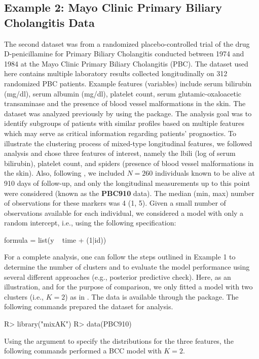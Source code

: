 \subsection{Example 2: Mayo Clinic Primary Biliary Cholangitis Data}
The second dataset was from a randomized placebo-controlled trial of the drug D-penicillamine for Primary Biliary Cholangitis conducted between 1974 and 1984 at the Mayo Clinic Primary Biliary Cholangitis (PBC). The dataset used here contains multiple laboratory results collected longitudinally on 312 randomized PBC patients. Example features (variables) include serum bilirubin (mg/dl), serum albumin (mg/dl), platelet count, serum glutamic-oxaloacetic transaminase and the presence of blood vessel malformations in the skin. The dataset was analyzed previously by \citet{Komarek2013} using the  package. The analysis goal was to identify subgroups of patients with similar profiles based on multiple features which may serve as critical information regarding patients’ prognostics.
To illustrate the clustering process of mixed-type longitudinal features, we followed \citet{Komarek2013} analysis and chose three features of interest, namely the lbili (log of serum bilirubin), platelet count, and spiders (presence of blood vessel malformations in the skin). Also, following \citet{Komarek2013}, we included $N = 260$ individuals known to be alive at 910 days of follow-up, and only the longitudinal measurements up to this point were considered (known as the \textbf{PBC910} data). The median (min, max) number of observations for these markers was 4 (1, 5). Given a small number of observations available for each individual, we considered a model with only a random intercept, i.e., using the following specification:
\begin{example}
     		formula = list(y ~ time + (1|id))
\end{example} 
For a complete analysis, one can follow the steps outlined in Example 1 to determine the number of clusters and to evaluate the model performance using several different approaches (e.g., posterior predictive check). Here, as an illustration, and for the purpose of comparison, we only fitted a model with two clusters (i.e., $K=2$) as in \citet{Komarek2013}. 
The data is available through the  package. The following commands prepared the dataset for analysis.
\begin{example}
R> library("mixAK")
R> data(PBC910)
\end{example} 
Using the argument  to specify the distributions for the three features, the following commands performed a BCC model with $K=2$.
